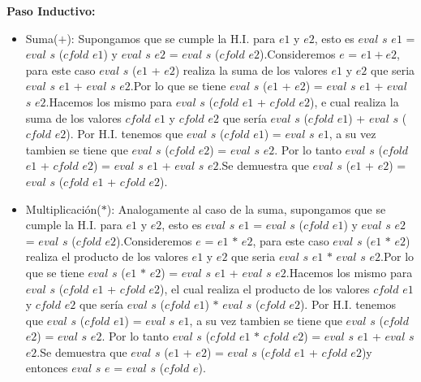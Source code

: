 \documentclass{article}
\begin{document}
\begin{itemize}
\begin{itemize}
                \textbf{Paso Inductivo:}
                \begin{itemize}
                    \item Suma($+$): Supongamos que se cumple la H.I. para $e1$ y $e2$, esto es $eval$ $s$ $e1$ = $eval$ $s$ ($cfold$ $e1$) y $eval$ $s$ $e2$ = $eval$ $s$ ($cfold$ $e2$).Consideremos $e$ = $e1 + e2$, para este caso $eval$ $s$ ($e1$ + $e2$) realiza la suma de los valores $e1$ y $e2$ que seria $eval$ $s$ $e1$ + $eval$ $s$ $e2$.Por lo que se tiene $eval$ $s$ ($e1$ + $e2$) = $eval$ $s$ $e1$ + $eval$ $s$ $e2$.Hacemos los mismo para $eval$ $s$ ($cfold$ $e1$ + $cfold$ $e2$), e cual realiza la suma de los valores $cfold$ $e1$ y $cfold$ $e2$ que sería $eval$ $s$ ($cfold$ $e1$) + $eval$ $s$ ($cfold$ $e2$). Por H.I. tenemos que $eval$ $s$ ($cfold$ $e1$) = $eval$ $s$ $e1$, a su vez tambien se tiene que $eval$ $s$ ($cfold$ $e2$) = $eval$ $s$ $e2$. Por lo tanto $eval$ $s$ ($cfold$ $e1$ + $cfold$ $e2$) = $eval$ $s$ $e1$ + $eval$ $s$ $e2$.Se demuestra que $eval$ $s$ ($e1$ + $e2$) = $eval$ $s$ ($cfold$ $e1$ + $cfold$ $e2$).\\

                    \item Multiplicación($*$): Analogamente al caso de la suma, supongamos que se cumple la H.I. para $e1$ y $e2$, esto es $eval$ $s$ $e1$ = $eval$ $s$ ($cfold$ $e1$) y $eval$ $s$ $e2$ = $eval$ $s$ ($cfold$ $e2$).Consideremos $e$ = $e1$ $*$ $e2$, para este caso $eval$ $s$ ($e1$ $*$ $e2$) realiza el producto de los valores $e1$ y $e2$ que seria $eval$ $s$ $e1$ $*$ $eval$ $s$ $e2$.Por lo que se tiene $eval$ $s$ ($e1$ $*$ $e2$) = $eval$ $s$ $e1$ + $eval$ $s$ $e2$.Hacemos los mismo para $eval$ $s$ ($cfold$ $e1$ + $cfold$ $e2$), el cual realiza el producto de los valores $cfold$ $e1$ y $cfold$ $e2$ que sería $eval$ $s$ ($cfold$ $e1$) $*$ $eval$ $s$ ($cfold$ $e2$). Por H.I. tenemos que $eval$ $s$ ($cfold$ $e1$) = $eval$ $s$ $e1$, a su vez tambien se tiene que $eval$ $s$ ($cfold$ $e2$) = $eval$ $s$ $e2$. Por lo tanto $eval$ $s$ ($cfold$ $e1$ $*$ $cfold$ $e2$) = $eval$ $s$ $e1$ + $eval$ $s$ $e2$.Se demuestra que $eval$ $s$ ($e1$ + $e2$) = $eval$ $s$ ($cfold$ $e1$ + $cfold$ $e2$)y entonces $eval$ $s$ $e$ = $eval$ $s$ ($cfold$ $e$).\\


\end{itemize}
\end{itemize}
\end{itemize}
\end{document}
